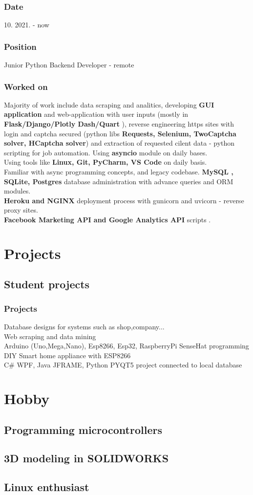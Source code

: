 \documentclass[10pt]{article}
\begin{document}
\subsubsection{Date}
10. 2021. -  now
\subsubsection{Position}
Junior Python Backend Developer - remote
\subsubsection{Worked on}
Majority of work include data scraping and analitics, developing \textbf{GUI application} and web-application with user inputs (mostly in \textbf{ Flask/Django/Plotly Dash/Quart} ), reverse engineering 
https sites with login and captcha secured (python libs \textbf{Requests, Selenium, TwoCaptcha solver, HCaptcha solver}) and extraction of requested cilent data - python scripting for job automation. Using \textbf{asyncio} module on daily bases.
\\ Using tools like \textbf{Linux, Git,  PyCharm, VS Code} on daily basis.  \\
Familiar with async programming concepts, and legacy codebase.
\textbf{MySQL , SQLite,  Postgres} database administration with advance queries and ORM modules.\\
\textbf{Heroku and NGINX} deployment process with gunicorn and uvicorn - reverse proxy sites.\\
\textbf{Facebook Marketing API and Google Analytics API} scripts .\\



\section{Projects}
\subsection{\textbf{Student projects}}
\subsubsection{Projects}
Database designs for systems such as shop,company...\\
Web scraping and data mining\\
Arduino (Uno,Mega,Nano), Esp8266, Esp32, RaspberryPi SenseHat programming\\
DIY Smart home appliance with ESP8266 \\
C{\#} WPF, Java JFRAME, Python PYQT5 project connected to local database\\
 


\section{Hobby}
\subsection{Programming microcontrollers}
\subsection{3D modeling in SOLIDWORKS}
\subsection{Linux enthusiast}
\end{document}
